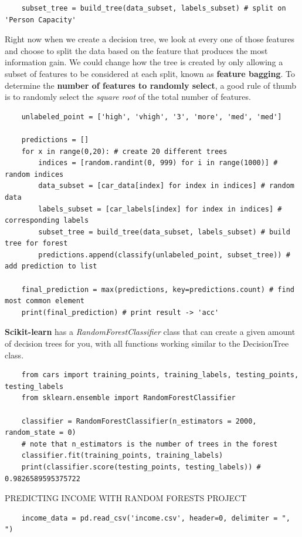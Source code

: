 \documentclass[11pt, a4paper]{article}
\begin{document}
\begin{spacing}{1.1}
\begin{lstlisting}
	subset_tree = build_tree(data_subset, labels_subset) # split on 'Person Capacity' \end{lstlisting} \vspace*{1mm}
	Right now when we create a decision tree, we look at every one of those features and choose to split the data based on the feature that produces the most information gain. We could change how the tree is created by only allowing a subset of features to be considered at each split, known as \textbf{feature bagging}. To determine the \textbf{number of features to randomly select}, a good rule of thumb is to randomly select the \textit{square root} of the total number of features.
	\begin{lstlisting}
	unlabeled_point = ['high', 'vhigh', '3', 'more', 'med', 'med']
	
	predictions = []
	for x in range(0,20): # create 20 different trees
		indices = [random.randint(0, 999) for i in range(1000)] # random indices
		data_subset = [car_data[index] for index in indices] # random data
		labels_subset = [car_labels[index] for index in indices] # corresponding labels
		subset_tree = build_tree(data_subset, labels_subset) # build tree for forest
		predictions.append(classify(unlabeled_point, subset_tree)) # add prediction to list
	
	final_prediction = max(predictions, key=predictions.count) # find most common element
	print(final_prediction) # print result -> 'acc'	\end{lstlisting} \vspace*{1mm}
	\textbf{Scikit-learn} has a \textit{RandomForestClassifier} class that can create a given amount of decision trees for you, with all functions working similar to the DecisionTree class. 
	\begin{lstlisting}
	from cars import training_points, training_labels, testing_points, testing_labels
	from sklearn.ensemble import RandomForestClassifier
	
	classifier = RandomForestClassifier(n_estimators = 2000, random_state = 0)
	# note that n_estimators is the number of trees in the forest
	classifier.fit(training_points, training_labels)
	print(classifier.score(testing_points, testing_labels)) # 0.9826589595375722\end{lstlisting} \vspace*{1mm}
	PREDICTING INCOME WITH RANDOM FORESTS PROJECT
	\begin{lstlisting}
	income_data = pd.read_csv('income.csv', header=0, delimiter = ", ")
	

\end{lstlisting}
\end{spacing}
\end{document}
